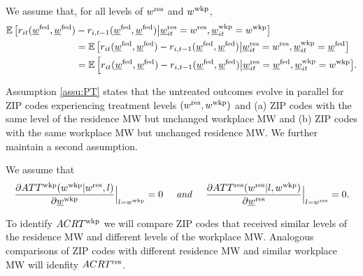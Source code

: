\begin{assu} \label{assu:PT}
    We assume that, for all levels of $w^{\text{res}}$ and $w^{\text{wkp}}$,
    \begin{align*}\label{eq:PT}
        \operatorname{\mathbb{E}}\big[r_{it}(\underline{w}^{\text{fed}}, \underline{w}^{\text{fed}}) & - r_{i,t-1}(\underline{w}^{\text{fed}}, \underline{w}^{\text{fed}}) 
                \big| \underline{w}_{it}^{\text{res}}=w^{\text{res}}, \underline{w}_{it}^{\text{wkp}}=w^{\text{wkp}} \big] \\
        & = \operatorname{\mathbb{E}}\big[r_{it}(\underline{w}^{\text{fed}}, \underline{w}^{\text{fed}}) - r_{i,t-1}(\underline{w}^{\text{fed}}, \underline{w}^{\text{fed}})
                \big| \underline{w}_{it}^{\text{res}}=w^{\text{res}}, \underline{w}_{it}^{\text{wkp}}=\underline{w}^{\text{fed}} \big] \\
        & = \operatorname{\mathbb{E}}\Big[r_{it}(\underline{w}^{\text{fed}}, \underline{w}^{\text{fed}}) - r_{i,t-1}(\underline{w}^{\text{fed}}, \underline{w}^{\text{fed}})
                \big| \underline{w}_{it}^{\text{res}}=\underline{w}^{\text{fed}}, \underline{w}_{it}^{\text{wkp}}=w^{\text{wkp}} \big] .
    \end{align*}
\end{assu}

Assumption \ref{assu:PT} states that the untreated outcomes evolve in parallel 
for ZIP codes experiencing treatment levels $(w^{\text{res}},w^{\text{wkp}})$ and 
(a) ZIP codes with the same level of the residence MW but unchanged workplace MW and
(b) ZIP codes with the same workplace MW but unchanged residence MW.
We further maintain a second assumption.

\begin{assu} \label{assu:no_selection}
    We assume that
    \begin{equation*}\label{eq:no_selection_workplace}
        \frac{\partial ATT^{\text{wkp}}(w^{\text{wkp}} | w^{\text{res}}, l)}
             {\partial \underline{w}^{\text{wkp}}} \Big|_{l = w^{\text{wkp}}} = 0
        \quad\text{\textit{ and }}\quad
        \frac{\partial ATT^{\text{res}}(w^{\text{res}} | l, w^{\text{wkp}})}
             {\partial \underline{w}^{\text{res}}} \Big|_{l = w^{\text{res}}} = 0 .
    \end{equation*}
\end{assu}

To identify $ACRT^{\text{wkp}}$ we will compare ZIP codes that received similar levels 
of the residence MW and different levels of the workplace MW.
Analogous comparisons of ZIP codes with different residence MW and similar 
workplace MW will idenfity $ACRT^{\text{res}}$.

